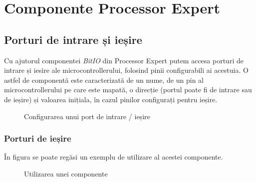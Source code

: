 \chapter{Componente Processor Expert}

\section{Porturi de intrare și ieșire}
Cu ajutorul componentei \textit{BitIO} din Processor Expert putem accesa porturi de intrare și iesire ale microcontrollerului, folosind pinii configurabili ai acestuia. O astfel de componentă este caracterizată de un nume, de un pin al microcontrollerului pe care este mapată, o direcție (portul poate fi de intrare sau de ieșire) și valoarea inițiala, în cazul pinilor configurați pentru ieșire. 

\begin{figure}[h!]
  \vspace{-20pt}
  \vspace{-15pt}
  \caption{\label{fig:CodeWarrior-BitIO} Configurarea unui port de intrare / ieșire}
  \vspace{-20pt}
\end{figure}

\subsection{Porturi de ieșire}

În figura se poate regăsi un exemplu de utilizare al acestei componente.

\begin{figure}
  \vspace{-20pt}
  \vspace{-15pt}
  \caption{\label{fig:CodeWarrior-PExOutputIO} Utilizarea unei componente}
  \vspace{-20pt}
\end{figure}

